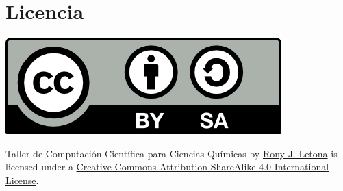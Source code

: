 \documentclass[10pt,letterpaper]{article}
\begin{document}
\section*{Licencia}

\noindent \includegraphics{img/cc_big.png}

\noindent Taller de Computaci\'on Cient\'ifica para Ciencias Qu\'imicas by \href{http://github.com/zronyj/TC3Q}{Rony J. Letona} is licensed under a \href{http://creativecommons.org/licenses/by-sa/4.0/}{Creative Commons Attribution-ShareAlike 4.0 International License}.
\end{document}
